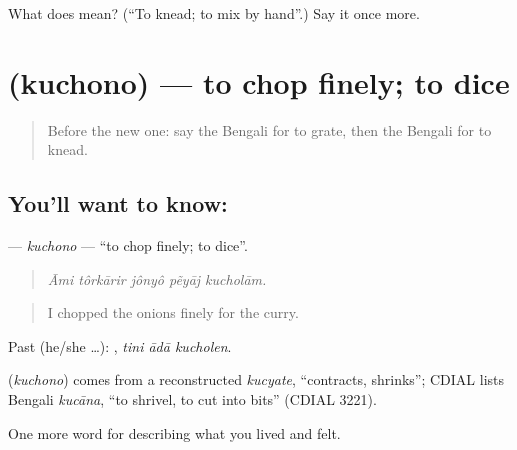 \begin{tcolorbox}[breakable,colback=teal!4,colframe=teal!35!black,title={Before you move on}]
What does  mean? (\textquotedblleft{}To knead; to mix by hand\textquotedblright{}.) Say it once more.
\end{tcolorbox}
\section[\texorpdfstring{\bn{কুচোনো} (kuchono)}{কুচোনো (kuchono)}]{ (kuchono) — to chop finely; to dice}

\label{lesson:BN-C513-kuchono}



\begin{quote}
Before the new one: say the Bengali for to grate, then the Bengali for to knead.
\end{quote}

\subsection*{You'll want to know: }
\textbf{} — \emph{kuchono} — \textquotedblleft{}to chop finely; to dice\textquotedblright{}.

\begin{quote}
    
\end{quote}

\begin{quote}
\emph{Āmi tôrkārir jônyô pẽyāj kucholām.}
\end{quote}

\begin{quote}
I chopped the onions finely for the curry.
\end{quote}

Past (he/she …):   , \emph{tini ādā kucholen}.

\begin{cousinweb}
\textbf{} (\emph{kuchono}) comes from a reconstructed \emph{kucyate}, \textquotedblleft{}contracts, shrinks\textquotedblright{}; CDIAL lists Bengali \emph{kucāna}, \textquotedblleft{}to shrivel, to cut into bits\textquotedblright{} (CDIAL 3221).
\end{cousinweb}

\begin{grammarlens}[title={What you've built}]
One more word for describing what you lived and felt.
\end{grammarlens}


